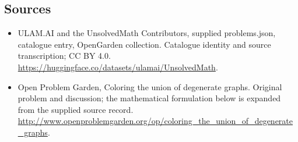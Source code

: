 \documentclass[11pt,a4paper]{article}
\begin{document}
\subsection{Sources}
\begin{itemize}
\item[S1] ULAM.AI and the UnsolvedMath Contributors, supplied problems.json, catalogue entry, OpenGarden collection. Catalogue identity and source transcription; CC BY 4.0.
\url{https://huggingface.co/datasets/ulamai/UnsolvedMath}.
\item[S2] Open Problem Garden, Coloring the union of degenerate graphs. Original problem and discussion; the mathematical formulation below is expanded from the supplied source record.
\url{http://www.openproblemgarden.org/op/coloring_the_union_of_degenerate_graphs}.

\end{itemize}
\end{document}

